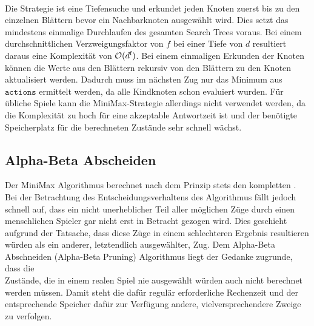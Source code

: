 \\ Die Strategie ist eine Tiefensuche und erkundet jeden Knoten zuerst bis zu den einzelnen Blättern bevor ein Nachbarknoten ausgewählt wird. Dies setzt das mindestens einmalige Durchlaufen des gesamten Search Trees voraus. Bei einem durchschnittlichen Verzweigungsfaktor von $f$ bei einer Tiefe von $d$ resultiert daraus eine Komplexität von $\mathcal{O}(d\textsuperscript{f})$. Bei einem einmaligen Erkunden der Knoten können die Werte aus den Blättern rekursiv von den Blättern zu den Knoten aktualisiert werden. Dadurch muss im nächsten Zug nur das Minimum aus $\mathtt{actions}$ ermittelt werden, da alle Kindknoten schon evaluiert wurden. Für übliche Spiele kann die MiniMax-Strategie allerdings nicht verwendet werden, da die Komplexität zu hoch für eine akzeptable Antwortzeit ist und der benötigte Speicherplatz für die berechneten Zustände sehr schnell wächst.
\subsection{Alpha-Beta Abscheiden}
Der MiniMax Algorithmus berechnet nach dem Prinzip  stets den kompletten \gtree. 
\\Bei der Betrachtung des Entscheidungsverhaltens des Algorithmus fällt jedoch schnell auf, dass ein nicht unerheblicher Teil aller möglichen Züge durch einen menschlichen Spieler gar nicht erst in Betracht gezogen wird. Dies geschieht aufgrund der Tatsache, dass diese Züge in einem schlechteren Ergebnis resultieren würden als ein anderer, letztendlich ausgewählter, Zug.\newline
Dem Alpha-Beta Abschneiden (Alpha-Beta Pruning) Algorithmus liegt der Gedanke zugrunde, dass die \\Zustände, die in einem realen Spiel nie ausgewählt würden auch nicht berechnet werden müssen. Damit steht die dafür regulär erforderliche Rechenzeit und der entsprechende Speicher dafür zur Verfügung andere, vielversprechendere Zweige zu verfolgen.
